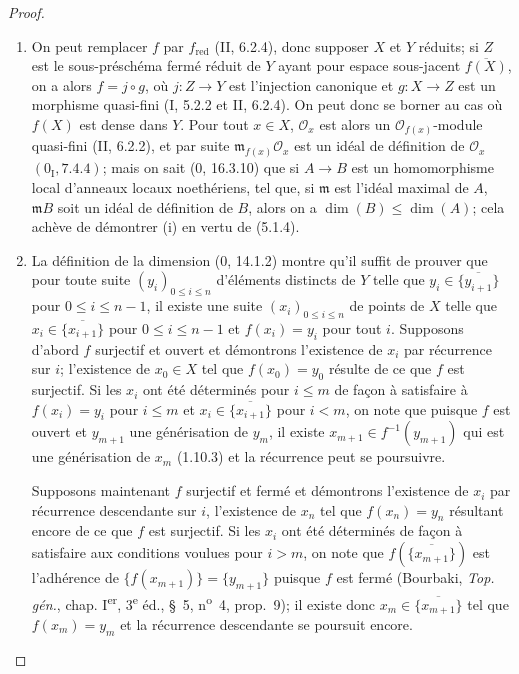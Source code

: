 \begin{proof}
\begin{enumerate}
\item[(i)] On peut remplacer $f$ par $f_{\mathrm{red}}$ (II, 6.2.4), donc
supposer $X$ et $Y$ réduits; si $Z$ est le sous-préschéma fermé réduit de $Y$
ayant pour espace sous-jacent $\overline{f(X)}$, on a alors $f=j\circ g$, où
$j:Z\to Y$ est l'injection canonique et $g:X\to Z$ est un morphisme
quasi-fini (I, 5.2.2 et II, 6.2.4). On peut donc se borner au cas où $f(X)$
est dense dans $Y$. Pour tout $x\in X$, $\mathcal O_x$ est alors un
$\mathcal O_{f(x)}$-module quasi-fini (II, 6.2.2), et par suite
$\mathfrak m_{f(x)}\mathcal O_x$ est un idéal de définition de $\mathcal O_x$
$(0_{\mathrm I},7.4.4)$; mais on sait (0, 16.3.10) que si $A\to B$ est un
homomorphisme local d'anneaux locaux noethériens, tel que, si $\mathfrak m$
est l'idéal maximal de $A$, $\mathfrak mB$ soit un idéal de définition de
$B$, alors on a $\dim(B)\leq\dim(A)$; cela achève de démontrer (i) en vertu
de (5.1.4).

\item[(ii)] La définition de la dimension (0, 14.1.2) montre qu'il suffit de
prouver que pour toute suite $(y_i)_{0\leq i\leq n}$ d'éléments distincts de
$Y$ telle que $y_i\in\overline{\{y_{i+1}\}}$ pour $0\leq i\leq n-1$, il
existe une suite $(x_i)_{0\leq i\leq n}$ de points de $X$ telle que
$x_i\in\overline{\{x_{i+1}\}}$ pour $0\leq i\leq n-1$ et $f(x_i)=y_i$
pour tout $i$. Supposons d'abord $f$ surjectif et ouvert et démontrons
l'existence de $x_i$ par récurrence sur $i$; l'existence de $x_0\in X$ tel
que $f(x_0)=y_0$ résulte de ce que $f$ est surjectif. Si les $x_i$ ont été
déterminés pour $i\leq m$ de façon à satisfaire à $f(x_i)=y_i$ pour
$i\leq m$ et $x_i\in\overline{\{x_{i+1}\}}$ pour $i<m$, on note que puisque
$f$ est ouvert et $y_{m+1}$ une générisation de $y_m$, il existe
$x_{m+1}\in f^{-1}(y_{m+1})$ qui est une générisation de $x_m$ (1.10.3) et
la récurrence peut se poursuivre.


Supposons maintenant $f$ surjectif et fermé et démontrons l'existence de
$x_i$ par récurrence descendante sur $i$, l'existence de $x_n$ tel que
$f(x_n)=y_n$ résultant encore de ce que $f$ est surjectif. Si les $x_i$ ont
été déterminés de façon à satisfaire aux conditions voulues pour $i>m$, on
note que $f(\overline{\{x_{m+1}\}})$ est l'adhérence de
$\{f(x_{m+1})\}=\{y_{m+1}\}$ puisque $f$ est fermé (Bourbaki,
\emph{Top. gén.}, chap. I\textsuperscript{er}, 3\textsuperscript{e} éd.,
\S~5, n\textsuperscript{o}~4, prop.~9); il existe donc
$x_m\in\overline{\{x_{m+1}\}}$ tel que $f(x_m)=y_m$ et la récurrence
descendante se poursuit encore.
\end{enumerate}
\end{proof}

